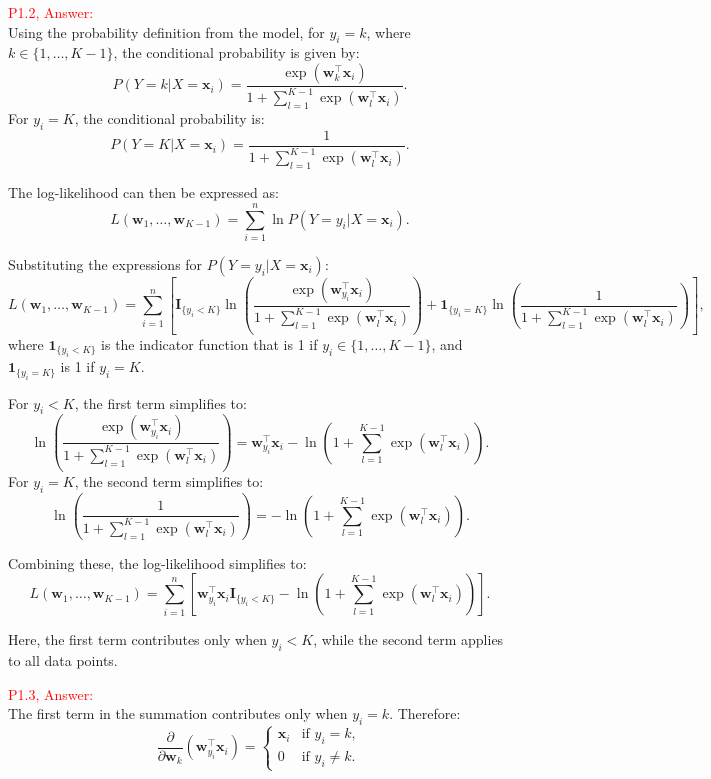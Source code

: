 \documentclass[11pt]{article}
\begin{document}
\textcolor{red}{P1.2, Answer:}\\

Using the probability definition from the model, for \( y_i = k \), where \( k \in \{1, \dots, K-1\} \), the conditional probability is given by:
\[
P(Y = k | X = \mathbf{x}_i) = \frac{\exp(\mathbf{w}_k^\top \mathbf{x}_i)}{1 + \sum_{l=1}^{K-1} \exp(\mathbf{w}_l^\top \mathbf{x}_i)}.
\]
For \( y_i = K \), the conditional probability is:
\[
P(Y = K | X = \mathbf{x}_i) = \frac{1}{1 + \sum_{l=1}^{K-1} \exp(\mathbf{w}_l^\top \mathbf{x}_i)}.
\]

The log-likelihood can then be expressed as:
\[
L(\mathbf{w}_1, \dots, \mathbf{w}_{K-1}) = \sum_{i=1}^n \ln P(Y = y_i | X = \mathbf{x}_i).
\]

Substituting the expressions for \( P(Y = y_i | X = \mathbf{x}_i) \):
\[
L(\mathbf{w}_1, \dots, \mathbf{w}_{K-1}) = \sum_{i=1}^n \left[ \mathbf{I}_{\{y_i < K\}} \ln \left( \frac{\exp(\mathbf{w}_{y_i}^\top \mathbf{x}_i)}{1 + \sum_{l=1}^{K-1} \exp(\mathbf{w}_l^\top \mathbf{x}_i)} \right) + \mathbf{1}_{\{y_i = K\}} \ln \left( \frac{1}{1 + \sum_{l=1}^{K-1} \exp(\mathbf{w}_l^\top \mathbf{x}_i)} \right) \right],
\]
where \( \mathbf{1}_{\{y_i < K\}} \) is the indicator function that is 1 if \( y_i \in \{1, \dots, K-1\} \), and \( \mathbf{1}_{\{y_i = K\}} \) is 1 if \( y_i = K \).

For \( y_i < K \), the first term simplifies to:
\[
\ln \left( \frac{\exp(\mathbf{w}_{y_i}^\top \mathbf{x}_i)}{1 + \sum_{l=1}^{K-1} \exp(\mathbf{w}_l^\top \mathbf{x}_i)} \right) = \mathbf{w}_{y_i}^\top \mathbf{x}_i - \ln \left( 1 + \sum_{l=1}^{K-1} \exp(\mathbf{w}_l^\top \mathbf{x}_i) \right).
\]
For \( y_i = K \), the second term simplifies to:
\[
\ln \left( \frac{1}{1 + \sum_{l=1}^{K-1} \exp(\mathbf{w}_l^\top \mathbf{x}_i)} \right) = - \ln \left( 1 + \sum_{l=1}^{K-1} \exp(\mathbf{w}_l^\top \mathbf{x}_i) \right).
\]

Combining these, the log-likelihood simplifies to:
\[
L(\mathbf{w}_1, \dots, \mathbf{w}_{K-1}) = \sum_{i=1}^n \left[ \mathbf{w}_{y_i}^\top \mathbf{x}_i \mathbf{I}_{\{y_i < K\}} - \ln \left( 1 + \sum_{l=1}^{K-1} \exp(\mathbf{w}_l^\top \mathbf{x}_i) \right) \right].
\]

Here, the first term contributes only when \( y_i < K \), while the second term applies to all data points.




\textcolor{red}{P1.3, Answer:}\\


The first term in the summation contributes only when \( y_i = k \). Therefore:
\[
\frac{\partial}{\partial \mathbf{w}_k} \left( \mathbf{w}_{y_i}^\top \mathbf{x}_i \right) = 
\begin{cases}
\mathbf{x}_i & \text{if } y_i = k, \\
0 & \text{if } y_i \neq k.
\end{cases}
\]
\end{document}
